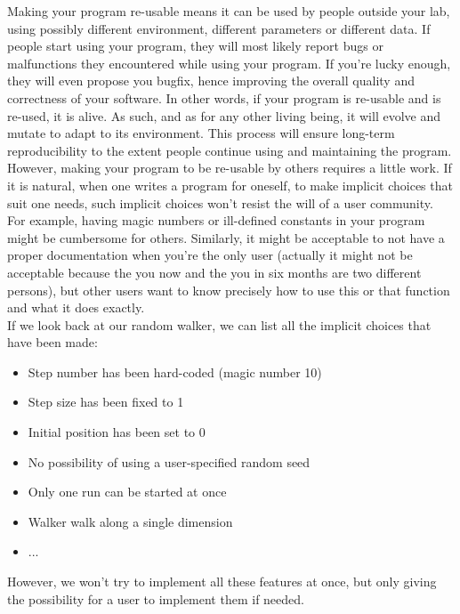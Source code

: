 \documentclass[a4paper,11pt]{article}
\begin{document}
Making your program re-usable means it can be used by people outside your lab,
using possibly different environment, different parameters or different data.
If people start using your program, they will most likely report bugs or malfunctions they encountered while using your program.
If you're lucky enough, they will even propose you bugfix, hence improving the overall quality and correctness of your software.
In other words, if your program is re-usable and is re-used, it is alive.
As such, and as for any other living being, it will evolve and mutate to adapt to its environment.
This process will ensure long-term reproducibility to the extent people continue using and maintaining the program.\\

However, making your program to be re-usable by others requires a little work. If it is natural, when one writes a program for oneself, to make implicit choices that suit one needs, such implicit choices won't resist the will of a user community. For example, having magic numbers or ill-defined constants in your program might be cumbersome for others. Similarly, it might be acceptable to not have a proper documentation when you're the only user (actually it might not be acceptable because the you now and the you in six months are two different persons), but other users want to know precisely how to use this or that function and what it does exactly.\\


If we look back at our random walker, we can list all the implicit choices that have been made:
\begin{itemize}
\item Step number has been hard-coded (magic number 10)
\item Step size has been fixed to 1
\item Initial position has been set to 0
\item No possibility of using a user-specified random seed
\item Only one run can be started at once
\item Walker walk along a single dimension
\item ...
\end{itemize}
However, we won't try to implement all these features at once, but only giving the possibility for a user to implement them if needed.
\end{document}
